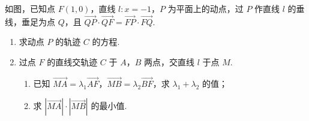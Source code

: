 \begin{problem}
如图，已知点 \(F(1, 0)\)，直线 \(l: x = -1\)，\(P\) 为平面上的动点，过 \(P\) 作直线 \(l\) 的垂线，垂足为点 \(Q\)，且 \(\overrightarrow{QP} \cdot \overrightarrow{QF} = \overrightarrow{FP} \cdot \overrightarrow{FQ}\).

\begin{enumerate}
\item 求动点 \(P\) 的轨迹 \(C\) 的方程.
\item 过点 \(F\) 的直线交轨迹 \(C\) 于 \(A\)，\(B\) 两点，交直线 \(l\) 于点 \(M\).

\begin{enumerate}
\item 已知 \(\overrightarrow{MA} = \lambda_1 \overrightarrow{AF}\)，\(\overrightarrow{MB} = \lambda_2 \overrightarrow{BF}\)，求 \(\lambda_1 + \lambda_2\) 的值；
\item 求 \(\left| \overrightarrow{MA} \right| \cdot \left| \overrightarrow{MB} \right|\) 的最小值.
\end{enumerate}
\end{enumerate}

\end{problem}

